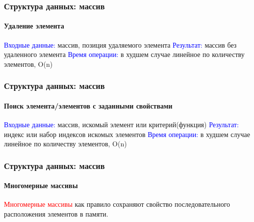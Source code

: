 \documentclass[aspectratio=169]{beamer}
\begin{document}
\begin{frame}
\frametitle{Структура данных: массив}
\framesubtitle{Удаление элемента}
\justifying
\small
\textcolor{blue}{Входные данные:} массив, позиция удаляемого элемента \newline
\textcolor{blue}{Результат:} массив без удаленного элемента\newline
\textcolor{blue}{Время операции:} в худшем случае линейное по количеству элементов, O(n)
\begin{figure}
    \captionsetup[subfigure]{labelformat=empty}
    \centering
\end{figure}
\end{frame}

\begin{frame}
\frametitle{Структура данных: массив}
\framesubtitle{Поиск элемента/элементов с заданными свойствами}
\justifying
\small
\textcolor{blue}{Входные данные:} массив, искомый элемент или критерий(функция) \newline
\textcolor{blue}{Результат:} индекс или набор индексов искомых элементов\newline
\textcolor{blue}{Время операции:} в худшем случае линейное по количеству элементов, O(n)
\begin{figure}
    \captionsetup[subfigure]{labelformat=empty}
    \centering
\end{figure}
\end{frame}

\begin{frame}
\frametitle{Структура данных: массив}
\framesubtitle{Многомерные массивы}
\justifying
\small
\textcolor{red}{Многомерные массивы} как правило сохраняют свойство последовательного расположения элементов в памяти.

\begin{figure}
    \captionsetup[subfigure]{labelformat=empty}
    \centering
\end{figure}
\end{frame}
\end{document}
